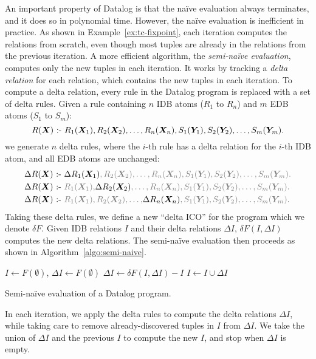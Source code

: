 An important property of Datalog is that the na\"ive evaluation 
 always terminates, and it does so in polynomial time.
However, the na\"ive evaluation is inefficient in practice.
As shown in Example~\ref{ex:tc-fixpoint},
 each iteration computes the relations from scratch, 
 even though most tuples are already in the relations from the previous iteration.
A more efficient algorithm, the {\em semi-na\"ive evaluation},
 computes only the new tuples in each iteration.
It works by tracking a {\em delta relation} for each relation,
 which contains the new tuples in each iteration.
To compute a delta relation, 
 every rule in the Datalog program is replaced with a set of delta rules.
Given a rule containing $n$ IDB atoms ($R_1$ to $R_n$) and $m$ EDB atoms ($S_1$ to $S_m$):
\[
  R({\bm X}) \text{ :- } R_1({\bm X}_1), R_2({\bm X}_2), \ldots, R_n({\bm X}_n), S_1({\bm Y}_1), S_2({\bm Y}_2), \ldots, S_m({\bm Y}_m).
\]
we generate $n$ delta rules, where the $i$-th rule has a delta relation for the $i$-th IDB atom,
 and all EDB atoms are unchanged:
%
\begin{align*}
\Delta R({\bm X}) &\cd \Delta R_1({\bm X}_1)\color{gray}, R_2({\bm X}_2), \ldots, R_n({\bm X}_n), S_1({\bm Y}_1), S_2({\bm Y}_2), \ldots, S_m({\bm Y}_m). \\
\Delta R({\bm X}) &\cd {\color{gray} R_1({\bm X}_1),} \Delta R_2({\bm X}_2)\color{gray}, \ldots, R_n({\bm X}_n), S_1({\bm Y}_1), S_2({\bm Y}_2), \ldots, S_m({\bm Y}_m). \\
\Delta R({\bm X}) &\cd {\color{gray} R_1({\bm X}_1), R_2({\bm X}_2), \ldots,} \Delta R_n({\bm X}_n)\color{gray}, S_1({\bm Y}_1), S_2({\bm Y}_2), \ldots, S_m({\bm Y}_m). \\
\end{align*}
%
Taking these delta rules, we define a new ``delta ICO'' for the program which we denote $\delta F$.
Given IDB relations $I$ and their delta relations $\Delta I$,
 $\delta F(I, \Delta I)$ computes the new delta relations.
The semi-na\"ive evaluation then proceeds as shown in Algorithm~\ref{algo:semi-naive}.
%
\begin{algorithm}
$I \gets F(\emptyset)$, $\Delta I \gets F(\emptyset)$ \label{algo:sn:init} \;
{
    $\Delta I \gets \delta F(I, \Delta I) - I$\;
    $I \gets I \cup \Delta I$
}
\caption{Semi-na\"ive evaluation of a Datalog program.}
\label{algo:semi-naive}
\end{algorithm}
%
In each iteration, we apply the delta rules to compute the delta relations $\Delta I$,
 while taking care to remove already-discovered tuples in $I$ from $\Delta I$.
We take the union of $\Delta I$ and the previous $I$ to compute the new $I$,
 and stop when $\Delta I$ is empty. 

